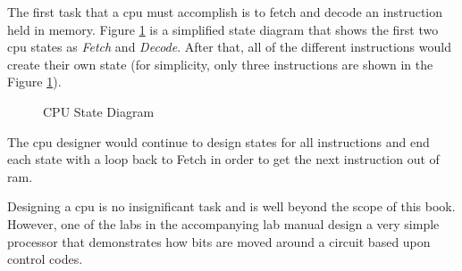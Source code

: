 The first task that a \gls{cpu} must accomplish is to fetch and decode an instruction held in memory. Figure \ref{SIM:fig:cpu_state_diagram} is a simplified state diagram that shows the first two \gls{cpu} states as \emph{Fetch} and \emph{Decode}. After that, all of the different instructions would create their own state (for simplicity, only three instructions are shown in the Figure \ref{SIM:fig:cpu_state_diagram}).

\begin{figure}[H]
  \caption{CPU State Diagram}
  \label{SIM:fig:cpu_state_diagram}
  \myfloatalign
\end{figure}

The \gls{cpu} designer would continue to design states for all instructions and end each state with a loop back to Fetch in order to get the next instruction out of \gls{ram}.

Designing a \gls{cpu} is no insignificant task and is well beyond the scope of this book. However, one of the labs in the accompanying lab manual design a very simple processor that demonstrates how bits are moved around a circuit based upon control codes.